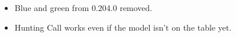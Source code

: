 

\subtitle{Layout and General}

\begin{itemize}[label={-}]
\item Blue and green from 0.204.0 removed.
\end{itemize}

\subtitle{Model Rules}

\begin{itemize}[label={-}]
\item Hunting Call works even if the model isn't on the table yet.
\end{itemize}

%

%

%

%

%

%

%

